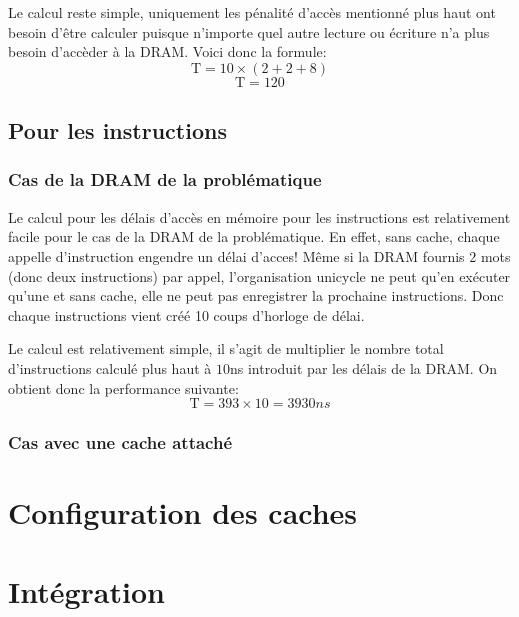 \documentclass[a11paper]{article}
\begin{document}
Le calcul reste simple, uniquement les pénalité d'accès mentionné plus haut ont besoin d'être calculer puisque n'importe quel autre lecture ou écriture n'a plus besoin d'accèder à
la DRAM. Voici donc la formule:
$$
\text{T} = 10\times(2+2+8)
$$
$$
\text{T} = 120
$$

\subsection{Pour les instructions}
\subsubsection{Cas de la DRAM de la problématique}
Le calcul pour les délais d'accès en mémoire pour les instructions est relativement facile pour le cas de la DRAM de la problématique. En effet, sans cache, chaque
appelle d'instruction engendre un délai d'acces! Même si la DRAM fournis $2$ mots (donc deux instructions) par appel, l'organisation unicycle ne peut qu'en exécuter
qu'une et sans cache, elle ne peut pas enregistrer la prochaine instructions. Donc chaque instructions vient créé 10 coups d'horloge de délai.

Le calcul est relativement simple, il s'agit de multiplier le nombre total d'instructions calculé plus haut à $10$ns introduit par les délais de la DRAM.
On obtient donc la performance suivante:
$$
\text{T}=393\times10=3930ns
$$

\subsubsection{Cas avec une cache attaché}



\section{Configuration des caches}

\section{Intégration}
\end{document}
